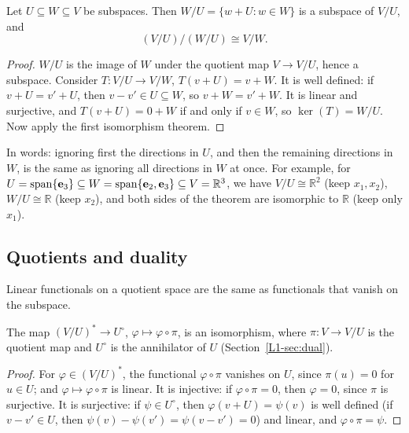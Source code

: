 \begin{theorem}\label{L1-thm:third-iso}
    Let $U \subseteq W \subseteq V$ be subspaces. Then $W/U = \{w + U : w \in W\}$ is a subspace of $V/U$, and
    \[(V/U)/(W/U) \cong V/W.\]
\end{theorem}

\begin{proof}
    $W/U$ is the image of $W$ under the quotient map $V \to V/U$, hence a subspace. Consider $T: V/U \to V/W$, $T(v + U) = v + W$. It is well defined: if $v + U = v' + U$, then $v - v' \in U \subseteq W$, so $v + W = v' + W$. It is linear and surjective, and $T(v + U) = 0 + W$ if and only if $v \in W$, so $\ker(T) = W/U$. Now apply the first isomorphism theorem.
\end{proof}

In words: ignoring first the directions in $U$, and then the remaining directions in $W$, is the same as ignoring all directions in $W$ at once. For example, for $U = \operatorname{span}\{\mathbf{e}_3\} \subseteq W = \operatorname{span}\{\mathbf{e}_2, \mathbf{e}_3\} \subseteq V = \mathbb{R}^3$, we have $V/U \cong \mathbb{R}^2$ (keep $x_1, x_2$), $W/U \cong \mathbb{R}$ (keep $x_2$), and both sides of the theorem are isomorphic to $\mathbb{R}$ (keep only $x_1$).

\subsection{Quotients and duality}

Linear functionals on a quotient space are the same as functionals that vanish on the subspace.

\begin{theorem}\label{L1-thm:quotient-dual}
    The map $(V/U)^* \to U^\circ$, $\varphi \mapsto \varphi \circ \pi$, is an isomorphism, where $\pi: V \to V/U$ is the quotient map and $U^\circ$ is the annihilator of $U$ (Section~\ref{L1-sec:dual}).
\end{theorem}

\begin{proof}
    For $\varphi \in (V/U)^*$, the functional $\varphi \circ \pi$ vanishes on $U$, since $\pi(u) = 0$ for $u \in U$; and $\varphi \mapsto \varphi \circ \pi$ is linear. It is injective: if $\varphi \circ \pi = 0$, then $\varphi = 0$, since $\pi$ is surjective. It is surjective: if $\psi \in U^\circ$, then $\varphi(v + U) = \psi(v)$ is well defined (if $v - v' \in U$, then $\psi(v) - \psi(v') = \psi(v - v') = 0$) and linear, and $\varphi \circ \pi = \psi$.
\end{proof}

